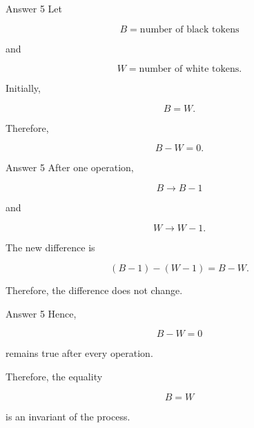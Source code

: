 \begin{frame}{Answer 5}
Let

$$
B=\text{number of black tokens}
$$

and

$$
W=\text{number of white tokens}.
$$

Initially,

$$
B=W.
$$

Therefore,

$$
B-W=0.
$$

\end{frame}

\begin{frame}{Answer 5}
After one operation,

$$
B\rightarrow B-1
$$

and

$$
W\rightarrow W-1.
$$

The new difference is

$$
(B-1)-(W-1)
=
B-W.
$$

Therefore, the difference does not change.
\end{frame}

\begin{frame}{Answer 5}
Hence,

$$
\boxed{B-W=0}
$$

remains true after every operation.

Therefore, the equality

$$
\boxed{B=W}
$$

is an invariant of the process.
\end{frame}
